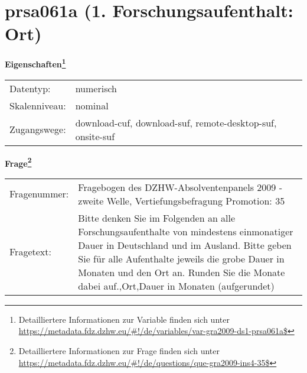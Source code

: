 
    \setcounter{footnote}{0}

    \vspace*{-1.8cm}
	\section{prsa061a (1. Forschungsaufenthalt: Ort)}
	\label{section:prsa061a}



    \vspace*{0.5cm}
    \noindent\textbf{Eigenschaften\footnote{Detailliertere Informationen zur Variable finden sich unter
		\url{https://metadata.fdz.dzhw.eu/\#!/de/variables/var-gra2009-ds1-prsa061a$}}}\\
	\begin{tabularx}{\hsize}{@{}lX}
	Datentyp: & numerisch \\
	Skalenniveau: & nominal \\
	Zugangswege: &
	  download-cuf, 
	  download-suf, 
	  remote-desktop-suf, 
	  onsite-suf
 \\
    \end{tabularx}



				\vspace*{0.5cm}
                \noindent\textbf{Frage\footnote{Detailliertere Informationen zur Frage finden sich unter
		              \url{https://metadata.fdz.dzhw.eu/\#!/de/questions/que-gra2009-ins4-35$}}}\\
				\begin{tabularx}{\hsize}{@{}lX}
					Fragenummer: &
					  Fragebogen des DZHW-Absolventenpanels 2009 - zweite Welle, Vertiefungsbefragung Promotion:
					  35
 \\
					Fragetext: & Bitte denken Sie im Folgenden an alle Forschungsaufenthalte von mindestens einmonatiger Dauer in Deutschland und im Ausland. Bitte geben Sie für alle Aufenthalte jeweils die grobe Dauer in Monaten und den Ort an. Runden Sie die Monate dabei auf.,Ort,Dauer in Monaten (aufgerundet) \\
				\end{tabularx}





